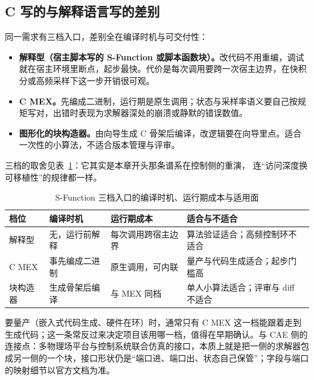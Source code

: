\documentclass[12pt,a4paper,fontset=fandol]{ctexbook}
\newcommand{\Lang}[1]{\textsf{#1}}
\newcommand{\CL}{\Lang{C}}
\newcommand{\DomCAE}{\Lang{CAE}}
\begin{document}
\subsection*{\CL{} 写的与解释语言写的差别}

同一需求有三档入口，差别全在编译时机与可交付性：

\begin{itemize}
\item \textbf{解释型（宿主脚本写的 S-Function 或脚本函数块）。}改代码不用重编，调试就在宿主环境里断点，起步最快。代价是每次调用要跨一次宿主边界，在快积分或高频采样下这一步开销很可观。
\item \textbf{\CL{} MEX。}先编成二进制，运行期是原生调用；状态与采样率语义要自己按规矩写对，出错时表现为求解器深处的崩溃或静默的错误数值。
\item \textbf{图形化的块构造器。}由向导生成 \CL{} 骨架后编译，改逻辑要在向导里点。适合一次性的小算法，不适合版本管理与评审。
\end{itemize}

三档的取舍见表~\ref{tab:ch07-sfun-tier}：它其实是本章开头那条谱系在控制侧的重演，
连``访问深度换可移植性''的规律都一样。

\begin{table}[htbp]
\centering
{\small
\begin{tabular}{%
 >{\raggedright\arraybackslash}p{}
 >{\raggedright\arraybackslash}p{}
 >{\raggedright\arraybackslash}p{}
 >{\raggedright\arraybackslash}p{}}
\toprule
档位 & 编译时机 & 运行期成本 & 适合与不适合 \\
\midrule
解释型 & 无，运行前解释 & 每次调用跨宿主边界 & 算法验证适合；高频控制环不适合 \\
\CL{} MEX & 事先编成二进制 & 原生调用，可内联 & 量产与代码生成适合；起步门槛高 \\
块构造器 & 生成骨架后编译 & 与 MEX 同档 & 单人小算法适合；评审与 diff 不适合 \\
\bottomrule
\end{tabular}
}
\caption{S-Function 三档入口的编译时机、运行期成本与适用面}
\label{tab:ch07-sfun-tier}
\end{table}

要量产（嵌入式代码生成、硬件在环）时，通常只有 \CL{} MEX 这一档能跟着走到生成代码；这一条常反过来决定项目该用哪一档，值得在早期确认。与 \DomCAE{} 侧的连接点：多物理场平台与控制系统联合仿真的接口，本质上就是把一侧的求解器包成另一侧的一个块，接口形状仍是``端口进、端口出、状态自己保管''；字段与端口的映射细节以官方文档为准。
\end{document}
